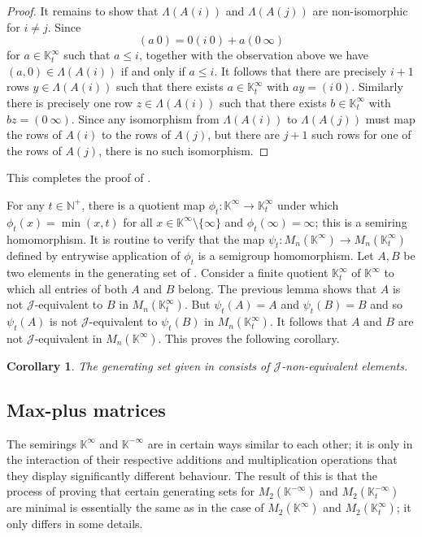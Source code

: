 \documentclass[11pt]{article}
\newtheorem{cor}[thm]{Corollary}
\numberwithin{equation}{section}
\renewcommand{\to}{\longrightarrow}
\newcommand{\J}{\mathscr{J}}
\newcommand{\N}{\mathbb{N}}
\newcommand{\Np}{\N^{+}}
\newcommand{\K}{\mathbb{K}}
\newcommand{\Kmin}{\K^{\infty}}
\newcommand{\Kmint}{\K^{\infty}_t}
\newcommand{\Kmax}{\K^{-\infty}}
\newcommand{\Kmaxt}{\K^{-\infty}_t}
\newcommand{\RowS}{\Lambda}
\begin{document}
\begin{proof}
  It remains to show that $\RowS(A(i))$ and $\RowS(A(j))$ are non-isomorphic for
  $i \neq j$. Since \[(a~0) = 0(i~0) + a(0~\infty)\] for $a \in \Kmint$ such
  that $a \leq i$, together with the observation above we have $(a, 0) \in
  \RowS(A(i))$ if and only if $a \leq i$. It follows that there are precisely $i
  + 1$ rows $y \in \RowS(A(i))$ such that there exists $a \in \Kmint$ with $ay =
  (i~0)$. Similarly there is precisely one row $z \in \RowS(A(i))$ such that
  there exists $b \in \Kmint$ with $bz = (0~\infty)$.  Since any isomorphism
  from $\RowS(A(i))$ to $\RowS(A(j))$ must map the rows of $A(i)$ to the rows of
  $A(j)$, but there are $j + 1$ such rows for one of the rows of $A(j)$, there
  is no such isomorphism.
\end{proof}
This completes the proof of .


For any $t \in \Np$, there is a quotient map $\phi_t: \Kmin \to \Kmint$ under
which $\phi_t(x) = \min(x, t)$ for all $x \in \Kmin\setminus\{\infty\}$ and
$\phi_t(\infty) = \infty$; this is a semiring homomorphism. It is routine to
verify that the map $\psi_t: M_n(\Kmin) \to M_n(\Kmint)$ defined by
entrywise application of $\phi_t$ is a semigroup homomorphism.
Let $A, B$ be two elements in the generating set of .
Consider a finite quotient $\Kmint$ of $\Kmin$ to which all entries of
both $A$ and $B$ belong. The previous lemma shows that $A$ is not
$\J$-equivalent to $B$ in $M_n(\Kmint)$. But $\psi_t(A) = A$ and $\psi_t(B) = B$
and so $\psi_t(A)$ is not $\J$-equivalent to $\psi_t(B)$ in $M_n(\Kmint)$. It
follows that $A$ and $B$ are not $\J$-equivalent in $M_n(\Kmin)$. This
proves the following corollary.

\begin{cor}
  The generating set given in  consists of
  $\J$-non-equivalent elements.
\end{cor}


\subsection{Max-plus matrices}

The semirings $\Kmin$ and $\Kmax$ are in certain ways similar to each other; it
is only in the interaction of their respective additions and multiplication
operations that they display significantly different behaviour. The result of
this is that the process of proving that certain generating sets for
$M_2(\Kmax)$ and $M_2(\Kmaxt)$ are minimal is essentially the same as in the case
of $M_2(\Kmin)$ and $M_2(\Kmint)$; it only differs in some details.
\end{document}
